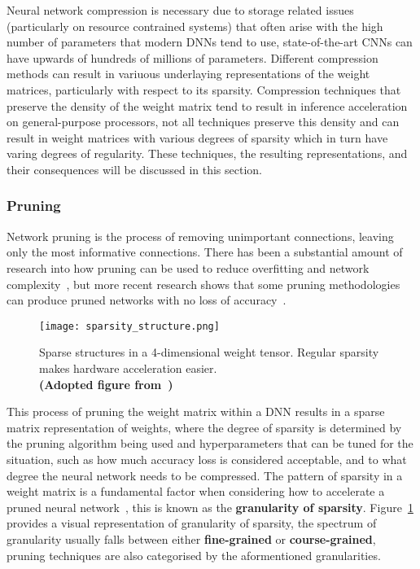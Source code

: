 \documentclass[../../D1.tex]{subfiles}
\begin{document}
Neural network compression is necessary due to storage related issues (particularly on resource contrained systems) that often arise with the high number of parameters that modern DNNs tend to use, state-of-the-art CNNs can have upwards of hundreds of millions of parameters. 
Different compression methods can result in variuous underlaying representations of the weight matrices, particularly with respect to its sparsity. 
Compression techniques that preserve the density of the weight matrix tend to result in inference acceleration on general-purpose processors\autocite{lebedevSpeedingupConvolutionalNeural2015,zhangAcceleratingVeryDeep2016}, not all techniques preserve this density and can result in weight matrices with various degrees of sparsity which in turn have varing degrees of regularity. 
These techniques, the resulting representations, and their consequences will be discussed in this section.

\subsubsection{Pruning}\label{sec:Pruning}
Network pruning is the process of removing unimportant connections, leaving only the most informative connections.
There has been a substantial amount of research into how pruning can be used to reduce overfitting and network complexity~\autocite{hansonComparingBiasesMinimal,hassibiSecondOrderDerivatives,lecunOptimalBrainDamage,stromPhonemeProbabilityEstimation1997}, but more recent research shows that some pruning methodologies can produce pruned networks with no loss of accuracy~\autocite{hanLearningBothWeights2015}.

\begin{figure}[H]
    \begin{center}
        \texttt{[image: sparsity\_structure.png]} 
    \end{center}
    
    \caption{Sparse structures in a 4-dimensional weight tensor. Regular sparsity makes hardware acceleration easier.\\ \textbf{(Adopted figure from~\autocite{maoExploringRegularitySparse2017})}}
    \label{fig:SparsityRegularity}   
\end{figure}

This process of pruning the weight matrix within a DNN results in a sparse matrix representation of weights, where the degree of sparsity is determined by the pruning algorithm being used and hyperparameters that can be tuned for the situation, such as how much accuracy loss is considered acceptable, and to what degree the neural network needs to be compressed. 
The pattern of sparsity in a weight matrix is a fundamental factor when considering how to accelerate a pruned neural network~\autocite{maoExploringRegularitySparse2017}, this is known as the \textbf{granularity of sparsity}.
Figure~\ref{fig:SparsityRegularity} provides a visual representation of granularity of sparsity, the spectrum of granularity usually falls between either \textbf{fine-grained} or \textbf{course-grained}, pruning techniques are also categorised by the aformentioned granularities.
\end{document}
